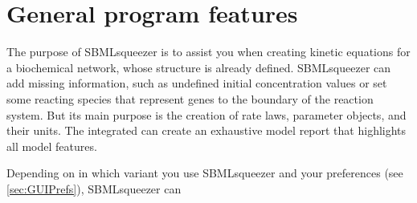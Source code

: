 \section{General program features}

The purpose of SBMLsqueezer is to assist you when creating kinetic equations for
a biochemical network, whose structure is already defined.
SBMLsqueezer can add missing information, such as undefined initial concentration values
or set some reacting species that represent genes to the boundary of the reaction system.
But its main purpose is the creation of rate laws, parameter objects, and their units.
The integrated \SBMLLaTeX can create an exhaustive model report that highlights all
model features.

Depending on in which variant you use SBMLsqueezer and your preferences (see \vref{sec:GUIPrefs}),
SBMLsqueezer can
